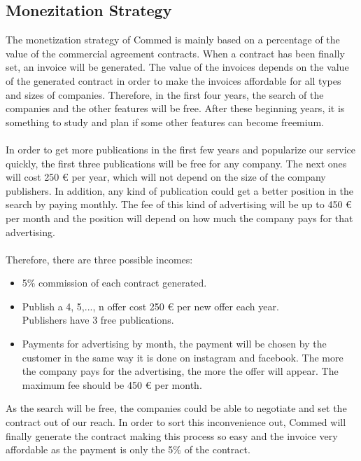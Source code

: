 \documentclass[./main.tex]{subfiles}
\begin{document}
\let\texteuro\euro
\subsection{Monezitation Strategy}
The monetization strategy of Commed is mainly based on a percentage of the value of the commercial agreement contracts. When a contract has been finally set, an invoice will be generated. The value of the invoices depends on the value of the generated contract in order to make the invoices affordable for all types and sizes of companies. Therefore, in the first four years, the search of the companies and the other features will be free. After these beginning years, it is something to study and plan if some other features can become freemium.
\\
\\
In order to get more publications in the first few years and popularize our service quickly, the first three publications will be free for any company. The next ones will cost 250 € per year, which will not depend on the size of the company publishers.
In addition, any kind of publication could get a better position in the search by paying monthly. The fee of this kind of advertising will be up to 450 € per month and the position will depend on how much the company pays for that advertising.
\\
\\
Therefore, there are three possible incomes:
\begin{itemize}
	\item 5\% commission of each contract generated.
	\item Publish a 4, 5,..., n offer cost 250 € per new offer each year. \\Publishers have 3 free publications.
	\item Payments for advertising by month, the payment will be chosen by the customer in the same way it is done on instagram and facebook. The more the company pays for the advertising, the more the offer will appear. The maximum fee should be 450 € per month.
\end{itemize}
As the search will be free, the companies could be able to negotiate and set the contract out of our reach. In order to sort this inconvenience out, Commed will finally generate the contract making this process so easy and the invoice very affordable as the payment is only the 5\% of the contract.
\end{document}
